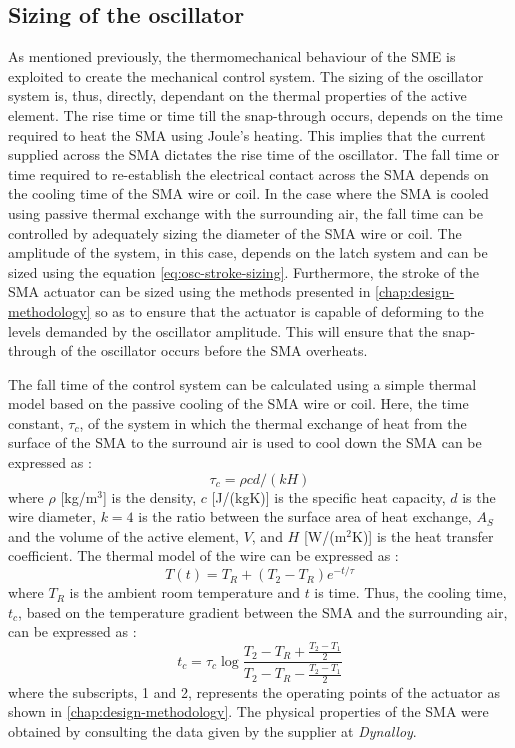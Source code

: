 \subsection{Sizing of the oscillator}
As mentioned previously, the thermomechanical behaviour of the SME is exploited to create the mechanical control system. The sizing of the oscillator system is, thus, directly, dependant on the thermal properties of the active element. The rise time or time till the snap-through occurs, depends on the time required to heat the SMA using Joule's heating. This implies that the current supplied across the SMA dictates the rise time of the oscillator. The fall time or time required to re-establish the electrical contact across the SMA depends on the cooling time of the SMA wire or coil. In the case where the SMA is cooled using passive thermal exchange with the surrounding air, the fall time can be controlled by adequately sizing the diameter of the SMA wire or coil. The amplitude of the system, in this case, depends on the latch system and can be sized using the equation \ref{eq:osc-stroke-sizing}. Furthermore, the stroke of the SMA actuator can be sized using the methods presented in \cref{chap:design-methodology} so as to ensure that the actuator is capable of deforming to the levels demanded by the oscillator amplitude. This will ensure that the snap-through of the oscillator occurs before the SMA overheats.

The fall time of the control system can be calculated using a simple thermal model based on the passive cooling of the SMA wire or coil. Here, the time constant, $\tau_c$, of the system in which the thermal exchange of heat from the surface of the SMA to the surround air is used to cool down the SMA can be expressed as :
\begin{equation}\label{eq:tau}
  \tau_c = \rho cd/(kH)
\end{equation}
where $\rho$ [kg/m$^3$] is the density, $c$ [J/(kgK)] is the specific heat capacity, $d$ is the wire diameter, $k = 4$ is the ratio between the surface area of heat exchange, $A_S$ and the volume of the active element, $V$, and $H$ [W/(m$^2$K)] is the heat transfer coefficient. The thermal model of the wire can be expressed as :
\begin{equation}\label{eq:thermalmodel}
  T(t) = T_R + (T_2-T_R)e^{-t/\tau}
\end{equation}
where $T_R$ is the ambient room temperature and $t$ is time. Thus, the cooling time, $t_c$, based on the temperature gradient between the SMA and the surrounding air, can be expressed as :
\begin{equation}\label{eq:coolingtime}
  t_c = \tau_c\log{\frac{T_2-T_R+\frac{T_2-T_1}{2}}{T_2-T_R-\frac{T_2-T_1}{2}}}
\end{equation}
where the subscripts, 1 and 2, represents the operating points of the actuator as shown in \cref{chap:design-methodology}. The physical properties of the SMA were obtained by consulting the data given by the supplier at \textit{Dynalloy}.

